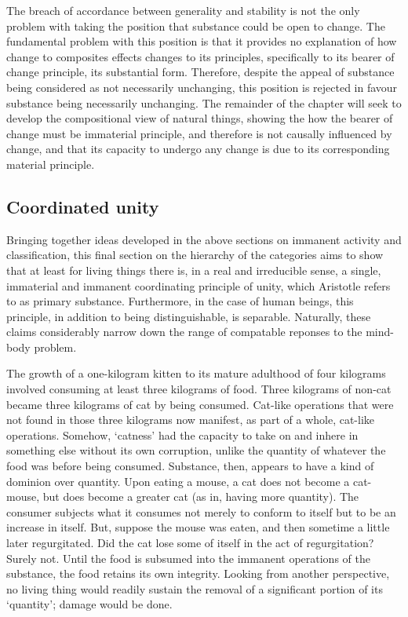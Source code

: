 The breach of accordance between generality and stability is not the only problem with taking the position that substance could be open to change. The fundamental problem with this position is that it provides no explanation of how change to composites effects changes to its principles, specifically to its bearer of change principle, its substantial form. Therefore, despite the appeal of substance being considered as not necessarily unchanging, this position is rejected in favour substance being necessarily unchanging. The remainder of the chapter will seek to develop the compositional view of natural things, showing the how the bearer of change must be immaterial principle, and therefore is not causally influenced by change, and that its capacity to undergo any change is due to its corresponding material principle.

\subsection{Coordinated unity}

Bringing together ideas developed in the above sections on immanent activity and classification, this final section on the hierarchy of the categories aims to show that at least for living things there is, in a real and irreducible sense, a single, immaterial and immanent coordinating principle of unity, which Aristotle refers to as primary substance. Furthermore, in the case of human beings, this principle, in addition to being distinguishable, is separable. Naturally, these claims considerably narrow down the range of compatable reponses to the mind-body problem.

The growth of a one-kilogram kitten to its mature adulthood of four kilograms involved consuming at least three kilograms of food. Three kilograms of non-cat became three kilograms of cat by being consumed. Cat-like operations that were not found in those three kilograms now manifest, as part of a whole, cat-like operations. Somehow, `catness' had the capacity to take on and inhere in something else without its own corruption, unlike the quantity of whatever the food was before being consumed. Substance, then, appears to have a kind of dominion over quantity. Upon eating a mouse, a cat does not become a cat-mouse, but does become a greater cat (as in, having more quantity). The consumer subjects what it consumes not merely to conform to itself but to be an increase in itself. But, suppose the mouse was eaten, and then sometime a little later regurgitated. Did the cat lose some of itself in the act of regurgitation? Surely not. Until the food is subsumed into the immanent operations of the substance, the food retains its own integrity. Looking from another perspective, no living thing would readily sustain the removal of a significant portion of its `quantity'; damage would be done.

